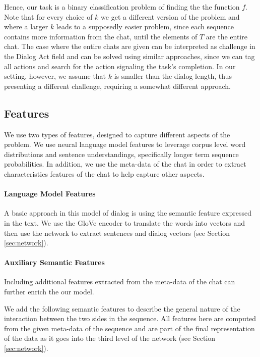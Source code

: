 Hence, our task is a binary classification 
problem of finding the the function $f$.  
Note that for every choice of $k$ we get a different 
version of the problem and where a larger $k$ leads 
to a supposedly easier problem, since each sequence contains 
more information from the chat, until the elements of $T$ 
are the entire chat. The case where the entire chats are 
given can be interpreted as challenge in the Dialog Act \cite{cs-CL-0006023,DBLP:conf/icassp/JiB05,DBLP:conf/coling/WermterL96}
field and can be solved using similar approaches, since we 
can tag all actions and search for the action signaling the task's completion. 
In our setting, however, we assume that $k$ is smaller than the dialog 
length, thus presenting a different challenge, requiring a somewhat different approach. 

\subsection{Features}
We use two types of features, designed to capture
different aspects of the problem. We use neural 
language model features to leverage corpus
level word distributions and sentence understandings, 
specifically longer term
sequence probabilities. In addition, we use the meta-data of the chat in order to extract characteristics features of the chat 
to help capture other aspects.

\paragraph*{Language Model Features}
A basic approach in this model of dialog is 
using the semantic feature expressed in the text. 
We use the GloVe \cite{glove} encoder to translate the words 
into vectors and then use the network to extract sentences and 
dialog vectors (see Section \ref{sec:network}). 



\paragraph*{Auxiliary Semantic Features}\label{sec:semantic}
Including additional features 
extracted from the meta-data of the chat can further enrich the our model. 

We add the following semantic features 
to describe the general nature 
of the interaction between the two sides 
in the sequence. All features here 
are computed from the given meta-data of the sequence and 
are part of the final representation of the data as it goes into the 
third level of the network (see Section \ref{sec:network}). 

